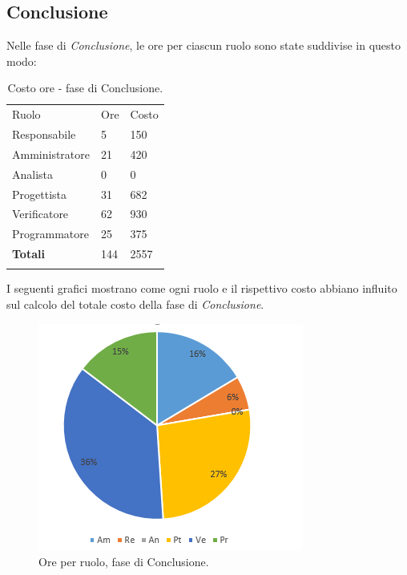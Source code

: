 \documentclass[a4paper]{article}
\begin{document}
		\subsection{Conclusione}
			Nelle fase di \emph{Conclusione}, le ore per ciascun ruolo sono state suddivise in questo modo:
			\begin{table}[H]
				\begin{tabularx}{\textwidth}{Y Y Y}
					Ruolo & Ore & Costo \\
					Responsabile & 5 & 150 \\
					Amministratore & 21 & 420 \\
					Analista & 0 & 0\\
					Progettista & 31 & 682\\
					Verificatore & 62 & 930\\
					Programmatore & 25 & 375 \\
					\textbf{Totali} & 144 & 2557 \\
				\end{tabularx}
				\caption{Costo ore - fase di Conclusione. } 
				\label{TCVeV}
			\end{table}
			I seguenti grafici mostrano come ogni ruolo e il rispettivo costo abbiano influito sul calcolo del totale 
			costo della fase di \emph{Conclusione}.
			\begin{figure}[H]
				\centering
				\includegraphics[scale=0.7]{pc_conclusione}
				\caption{Ore per ruolo, fase di Conclusione.}
			\end{figure}
\end{document}
